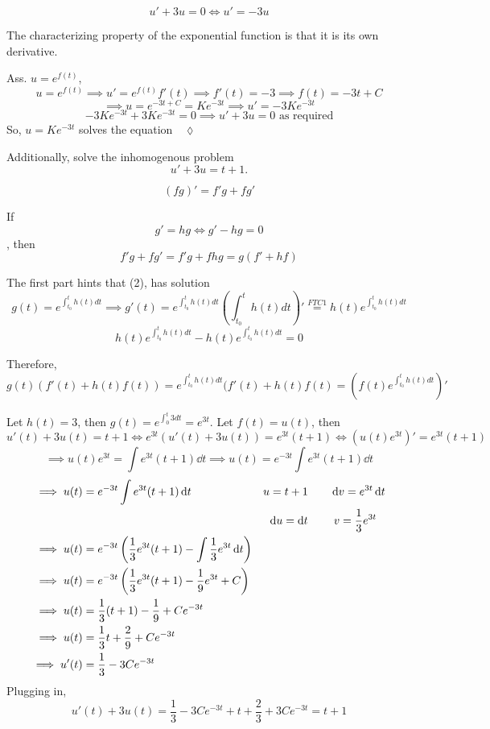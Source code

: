 \documentclass{article}
\begin{document}
\[u' + 3u = 0\iff u' = -3u\]

The characterizing property of the exponential function is that it is
its own derivative.

Ass. $u = e^{f(t)}$,
\[u = e^{f(t)} \implies u' = e^{f(t)}f'(t) \implies f'(t) = -3
  \implies f(t) = -3t + C\]
\[\implies u = e^{-3t+C} = Ke^{-3t} \implies u' =  -3Ke^{-3t}\]
\[-3Ke^{-3t} + 3Ke^{-3t}= 0 \implies u'+3u =0 \text{ as
    required}\]
So, $u = Ke^{-3t}$ solves the equation$\quad \lozenge$

Additionally, solve the inhomogenous problem
\[u' + 3u = t+1.\]

\setcounter{equation}{0}

\begin{equation} (fg)' = f'g+fg'\end{equation}

If \begin{equation}g'= hg \iff g'-hg = 0\end{equation}, then
\begin{equation}f'g+fg' = f'g+fhg = g(f'+hf)\end{equation}

The first part hints that (2), has solution\[g(t) = e^{\int_{t_0}^t h(t)
  dt}
\implies g'(t) = e^{\int_{t_0}^t h(t)
  dt}\left( \int_{t_0}^t h(t)
  dt \right)' \overset{FTC 1}{=} h(t)e^{\int_{t_0}^t h(t)
  dt}\]
\[h(t)e^{\int_{t_0}^t h(t)
    dt}-h(t)e^{\int_{t_0}^t h(t)
    dt} = 0\]
\newpage

Therefore, \[g(t)(f'(t)+h(t)f(t)) = e^{\int_{t_0}^t h(t) dt}(f'(t) +h(t)f(t) = \left(
  f(t)e^{\int_{t_0}^t h(t) dt}\right)'\]

Let $h(t) = 3$, then $g(t) = e^{\int_{0}^t 3dt} = e^{3t}$. Let $f(t)=
u(t)$, then
\[  u'(t)+3u(t) = t+1 \iff e^{3t}(u'(t)+3u(t)) = e^{3t}(t+1) \iff
  (u(t)e^{3t})' = e^{3t}(t+1)\]
\[\implies u(t)e^{3t} = \int e^{3t}(t+1) \dd{t} \implies u(t) =
  e^{-3t}\int  e^{3t}(t+1) \dd{t}\]
\begin{align*}
  \implies u(t) &=  e^{-3t}\int  e^{3t}(t+1) \dd{t} & u= t+1 &\hspace{2em}\dd{v} = e^{3t} \dd{t}\\
                &                                   &\dd{u}= \dd{t}&\hspace{2.3em} v = \frac{1}{3}e^{3t}\\
  \implies u(t) &= e^{-3t} \left( \frac{1}{3}e^{3t}(t+1) -\int
                  \frac{1}{3}e^{3t} \dd{t}\right)&&\\
  \implies u(t) &= e^{-3t} \left(  \frac{1}{3}e^{3t}(t+1)
  -\frac{1}{9}e^{3t} + C\right)&&\\
    \implies u(t) &=  \frac{1}{3}(t+1)
                    -\frac{1}{9} + Ce^{-3t}&&\\
  \implies u(t) &=  \frac{1}{3}t+
                  \frac{2}{9} + Ce^{-3t}&&\\
  \implies u'(t) &=  \frac{1}{3}-3Ce^{-3t}&&\\
\end{align*}
Plugging in,
\[u'(t)+3u(t) = \frac{1}{3}-3Ce^{-3t} + t+
  \frac{2}{3} + 3Ce^{-3t} = t+1\]
\end{document}
